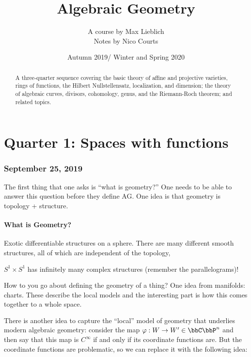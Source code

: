 \documentclass[12pt]{article}
\begin{document}
\title{Algebraic Geometry\vspace{-1ex}}
\author{A course by Max Lieblich\\
Notes by Nico Courts}
\date{Autumn 2019/ Winter and Spring 2020}
\maketitle

\begin{abstract}
	A three-quarter sequence covering the basic theory of affine and projective 
	varieties, rings of functions, the Hilbert Nullstellensatz, localization, and 
	dimension; the theory of algebraic curves, divisors, cohomology, genus, and the 
	Riemann-Roch theorem; and related topics. 
\end{abstract}

\part{Quarter 1: Spaces with functions}
\section{September 25, 2019}
The first thing that one asks is ``what is geometry?'' One needs to be able to answer this 
question before they define AG. One idea is that geometry is topology + structure.

\subsection{What is Geometry?}

\begin{ex}
	Exotic differentiable structures on a sphere. There are many different smooth structures,
	all of which are independent of the topology,

	$S^1\times S^1$ has infinitely many complex structures (remember the parallelograms)!
\end{ex}

How to you go about defining the geometry of a thing? One idea from manifolds: charts. These 
describe the local models and the interesting part is how this comes together to a whole space.

There is another idea to capture the ``local'' model of geometry that underlies modern algebraic geometry:
consider the map $\varphi:W\to W'\in\bbC\bbP^n$ and then say that this map is $C^\infty$ if and only if its coordinate
functions are. But the coordinate functions are problematic, so we can replace it with the following idea:
\end{document}

